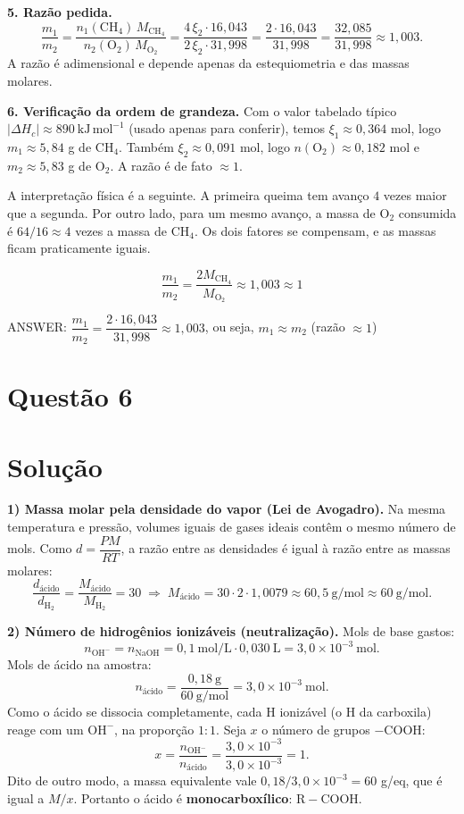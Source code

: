 \documentclass{article}%
\begin{document}
\textbf{5. Razão pedida.}
\[
\frac{m_1}{m_2} = \frac{n_1(\mathrm{CH_4})\,M_{\mathrm{CH_4}}}{n_2(\mathrm{O_2})\,M_{\mathrm{O_2}}}
= \frac{4\,\xi_2 \cdot 16{,}043}{2\,\xi_2 \cdot 31{,}998}
= \frac{2 \cdot 16{,}043}{31{,}998}
= \frac{32{,}085}{31{,}998} \approx 1{,}003 .
\]
A razão é adimensional e depende apenas da estequiometria e das massas molares.

\textbf{6. Verificação da ordem de grandeza.} Com o valor tabelado típico $|\Delta H_c| \approx 890\ \mathrm{kJ\,mol^{-1}}$ (usado apenas para conferir), temos $\xi_1 \approx 0{,}364$ mol, logo $m_1 \approx 5{,}84$ g de $\mathrm{CH_4}$. Também $\xi_2 \approx 0{,}091$ mol, logo $n(\mathrm{O_2}) \approx 0{,}182$ mol e $m_2 \approx 5{,}83$ g de $\mathrm{O_2}$. A razão é de fato $\approx 1$.

A interpretação física é a seguinte. A primeira queima tem avanço $4$ vezes maior que a segunda. Por outro lado, para um mesmo avanço, a massa de $\mathrm{O_2}$ consumida é $64/16 \approx 4$ vezes a massa de $\mathrm{CH_4}$. Os dois fatores se compensam, e as massas ficam praticamente iguais.

\[
\boxed{\dfrac{m_1}{m_2} = \dfrac{2M_{\mathrm{CH_4}}}{M_{\mathrm{O_2}}} \approx 1{,}003 \approx 1}
\]

ANSWER: $\dfrac{m_1}{m_2} = \dfrac{2 \cdot 16{,}043}{31{,}998} \approx 1{,}003$, ou seja, $m_1 \approx m_2$ (razão $\approx 1$)%
\newpage%
\section*{Questão 6}

\section*{Solução}

\textbf{1) Massa molar pela densidade do vapor (Lei de Avogadro).}
Na mesma temperatura e pressão, volumes iguais de gases ideais contêm o mesmo número de mols. Como $d = \dfrac{PM}{RT}$, a razão entre as densidades é igual à razão entre as massas molares:
\[
\frac{d_{\text{ácido}}}{d_{\mathrm{H_2}}} = \frac{M_{\text{ácido}}}{M_{\mathrm{H_2}}} = 30
\;\Rightarrow\;
M_{\text{ácido}} = 30 \cdot 2 \cdot 1{,}0079 \approx 60{,}5 \ \text{g/mol} \approx 60 \ \text{g/mol}.
\]

\textbf{2) Número de hidrogênios ionizáveis (neutralização).}
Mols de base gastos:
\[
n_{\mathrm{OH^-}} = n_{\mathrm{NaOH}} = 0{,}1 \ \text{mol/L} \cdot 0{,}030 \ \text{L} = 3{,}0 \times 10^{-3} \ \text{mol}.
\]
Mols de ácido na amostra:
\[
n_{\text{ácido}} = \frac{0{,}18 \ \text{g}}{60 \ \text{g/mol}} = 3{,}0 \times 10^{-3} \ \text{mol}.
\]
Como o ácido se dissocia completamente, cada H ionizável (o H da carboxila) reage com um $\mathrm{OH^-}$, na proporção $1:1$. Seja $x$ o número de grupos $-\mathrm{COOH}$:
\[
x = \frac{n_{\mathrm{OH^-}}}{n_{\text{ácido}}} = \frac{3{,}0 \times 10^{-3}}{3{,}0 \times 10^{-3}} = 1 .
\]
Dito de outro modo, a massa equivalente vale $0{,}18/3{,}0\times 10^{-3} = 60$ g/eq, que é igual a $M/x$. Portanto o ácido é \textbf{monocarboxílico}: $\mathrm{R{-}COOH}$.
\end{document}

